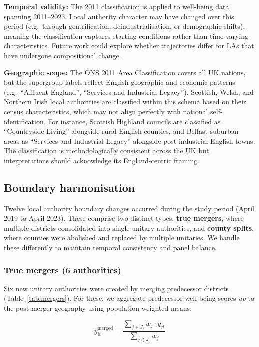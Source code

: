 \documentclass[12pt,a4paper]{article}
\begin{document}
\textbf{Temporal validity:} The 2011 classification is applied to well-being data spanning 2011--2023. Local authority character may have changed over this period (e.g.\ through gentrification, deindustrialisation, or demographic shifts), meaning the classification captures starting conditions rather than time-varying characteristics. Future work could explore whether trajectories differ for LAs that have undergone compositional change.

\textbf{Geographic scope:} The ONS 2011 Area Classification covers all UK nations, but the supergroup labels reflect English geographic and economic patterns (e.g.\ ``Affluent England'', ``Services and Industrial Legacy''). Scottish, Welsh, and Northern Irish local authorities are classified within this schema based on their census characteristics, which may not align perfectly with national self-identification. For instance, Scottish Highland councils are classified as ``Countryside Living'' alongside rural English counties, and Belfast suburban areas as ``Services and Industrial Legacy'' alongside post-industrial English towns. The classification is methodologically consistent across the UK but interpretations should acknowledge its England-centric framing.

\subsection{Boundary harmonisation}

Twelve local authority boundary changes occurred during the study period (April 2019 to April 2023). These comprise two distinct types: \textbf{true mergers}, where multiple districts consolidated into single unitary authorities, and \textbf{county splits}, where counties were abolished and replaced by multiple unitaries. We handle these differently to maintain temporal consistency and panel balance.

\subsubsection{True mergers (6 authorities)}

Six new unitary authorities were created by merging predecessor districts (Table~\ref{tab:mergers}). For these, we aggregate predecessor well-being scores \textit{up} to the post-merger geography using population-weighted means:

\[
\bar{y}_{it}^{\text{merged}} = \frac{\sum_{j \in J_i} w_j \cdot y_{jt}}{\sum_{j \in J_i} w_j}
\]
\end{document}
